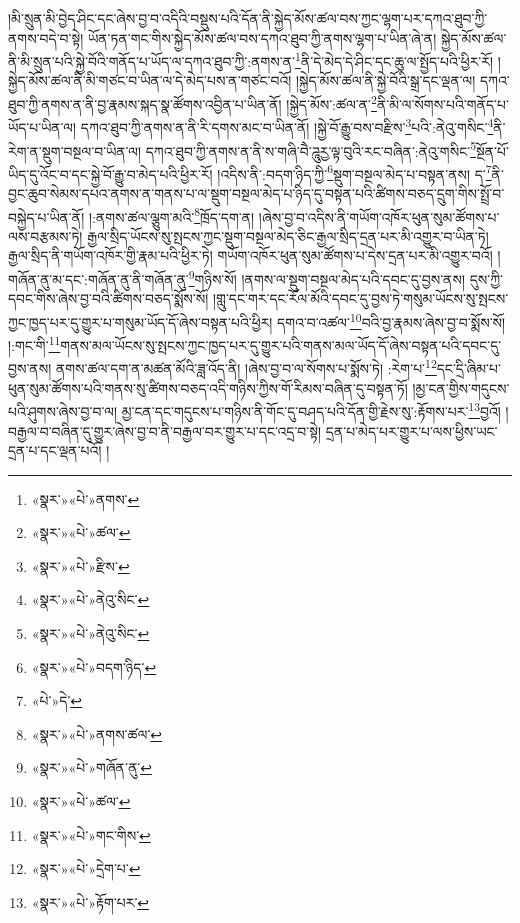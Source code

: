 །མི་སྲུན་མི་བྱེད་ཤིང་དང་ཞེས་བྱ་བ་འདིའི་བསྡུས་པའི་དོན་ནི་སྐྱེད་མོས་ཚལ་བས་ཀྱང་ལྷག་པར་དཀའ་ཐུབ་ཀྱི་ནགས་བདེ་བ་སྟེ། ཡོན་ཏན་གང་གིས་སྐྱེད་མོས་ཚལ་བས་དཀའ་ཐུབ་ཀྱི་ནགས་ལྷག་པ་ཡིན་ཞེ་ན། སྐྱེད་མོས་ཚལ་ནི་མི་སྲུན་པའི་སྐྱེ་བོའི་གནོད་པ་ཡོད་ལ་དཀའ་ཐུབ་ཀྱི་:ནགས་ན་\footnote{«སྣར་»«པེ་»ནགས་}ནི་དེ་མེད་དེ་ཤིང་དང་ཆུ་ལ་སྤྱོད་པའི་ཕྱིར་རོ། །སྐྱེད་མོས་ཚལ་ནི་མི་གཙང་བ་ཡིན་ལ་དེ་མེད་པས་ན་གཙང་བའོ། །སྐྱེད་མོས་ཚལ་ནི་སྐྱེ་བོའི་སྒྲ་དང་ལྡན་ལ། དཀའ་ཐུབ་ཀྱི་ནགས་ན་ནི་བྱ་རྣམས་སྐད་སྣ་ཚོགས་འབྱིན་པ་ཡིན་ནོ། །སྐྱེད་མོས་:ཚལ་ན་\footnote{«སྣར་»«པེ་»ཚལ་}ནི་མི་ལ་སོགས་པའི་གནོད་པ་ཡོད་པ་ཡིན་ལ། དཀའ་ཐུབ་ཀྱི་ནགས་ན་ནི་རི་དགས་མང་བ་ཡིན་ནོ། །སྐྱེ་བོ་རྒྱུ་བས་བརྫིས་\footnote{«སྣར་»«པེ་»རྫིས་}པའི་:ནེའུ་གསིང་\footnote{«སྣར་»«པེ་»ནེའུ་སིང་}ནི་རེག་ན་སྡུག་བསྔལ་བ་ཡིན་ལ། དཀའ་ཐུབ་ཀྱི་ནགས་ན་ནི་ས་གཞི་བཻ་ཌཱུརྱ་ལྟ་བུའི་རང་བཞིན་:ནེའུ་གསིང་\footnote{«སྣར་»«པེ་»ནེའུ་སིང་}སྔོན་པོ་ཡིད་དུ་འོང་བ་དང་སྐྱེ་བོ་རྒྱུ་བ་མེད་པའི་ཕྱིར་རོ། །འདིས་ནི་:བདག་ཉིད་ཀྱི་\footnote{«སྣར་»«པེ་»བདག་ཉིད་}སྡུག་བསྔལ་མེད་པ་བསྟན་ནས། ད་\footnote{«པེ་»དེ་}ནི་བྱང་ཆུབ་སེམས་དཔའ་ནགས་ན་གནས་པ་ལ་སྡུག་བསྔལ་མེད་པ་ཉིད་དུ་བསྟན་པའི་ཚིགས་བཅད་དྲུག་གིས་སྤྲོ་བ་བསྐྱེད་པ་ཡིན་ནོ། །:ནགས་ཚལ་ལྕུག་མའི་\footnote{«སྣར་»«པེ་»ནགས་ཚལ་}ཁྲོད་དག་ན། །ཞེས་བྱ་བ་འདིས་ནི་གཡོག་འཁོར་ཕུན་སུམ་ཚོགས་པ་ལས་བརྩམས་ཏེ། རྒྱལ་སྲིད་ཡོངས་སུ་སྤངས་ཀྱང་སྡུག་བསྔལ་མེད་ཅིང་རྒྱལ་སྲིད་དྲན་པར་མི་འགྱུར་བ་ཡིན་ཏེ། རྒྱལ་སྲིད་ནི་གཡོག་འཁོར་གྱི་རྣམ་པའི་ཕྱིར་ཏེ། གཡོག་འཁོར་ཕུན་སུམ་ཚོགས་པ་དེས་དྲན་པར་མི་འགྱུར་བའོ། །གཞོན་ནུ་མ་དང་:གཞོན་ནུ་ནི་གཞོན་ནུ་\footnote{«སྣར་»«པེ་»གཞོན་ནུ་}གཉིས་སོ། །ནགས་ལ་སྡུག་བསྔལ་མེད་པའི་དབང་དུ་བྱས་ནས། དུས་ཀྱི་དབང་གིས་ཞེས་བྱ་བའི་ཚིགས་བཅད་སྨོས་སོ། །གླུ་དང་གར་དང་རོལ་མོའི་དབང་དུ་བྱས་ཏེ་གསུམ་ཡོངས་སུ་སྤངས་ཀྱང་ཁྱད་པར་དུ་གྱུར་པ་གསུམ་ཡོད་དོ་ཞེས་བསྟན་པའི་ཕྱིར། དགའ་བ་འཚལ་\footnote{«སྣར་»«པེ་»ཚལ་}བའི་བྱ་རྣམས་ཞེས་བྱ་བ་སྨོས་སོ། །:གང་གི་\footnote{«སྣར་»«པེ་»གང་གིས་}གནས་མལ་ཡོངས་སུ་སྤངས་ཀྱང་ཁྱད་པར་དུ་གྱུར་པའི་གནས་མལ་ཡོད་དོ་ཞེས་བསྟན་པའི་དབང་དུ་བྱས་ནས། ནགས་ཚལ་དག་ན་མཚན་མོའི་ཟླ་འོད་ནི། །ཞེས་བྱ་བ་ལ་སོགས་པ་སྨོས་ཏེ། :རེག་པ་\footnote{«སྣར་»«པེ་»དྲེག་པ་}དང་དྲི་ཞིམ་པ་ཕུན་སུམ་ཚོགས་པའི་གནས་སུ་ཚིགས་བཅད་འདི་གཉིས་ཀྱིས་གོ་རིམས་བཞིན་དུ་བསྟན་ཏོ། །མྱ་ངན་གྱིས་གདུངས་པའི་ཤུགས་ཞེས་བྱ་བ་ལ། མྱ་ངན་དང་གདུངས་པ་གཉིས་ནི་གོང་དུ་བཤད་པའི་དོན་གྱི་རྗེས་སུ་:རྟོགས་པར་\footnote{«སྣར་»«པེ་»རྟོག་པར་}བྱའོ། །བརྒྱལ་བ་བཞིན་དུ་གྱུར་ཞེས་བྱ་བ་ནི་བརྒྱལ་བར་གྱུར་པ་དང་འདྲ་བ་སྟེ། དྲན་པ་མེད་པར་གྱུར་པ་ལས་ཕྱིས་ཡང་དྲན་པ་དང་ལྡན་པའོ། །
